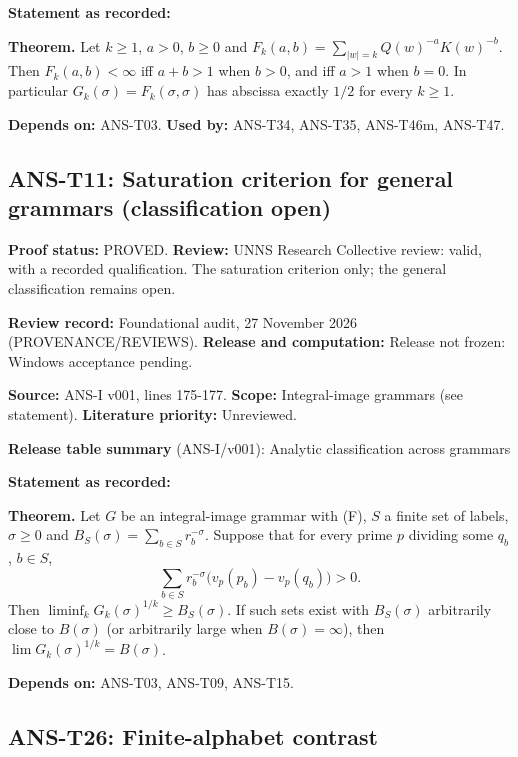\documentclass[
  11pt,
]{article}
\begin{document}
\textbf{Statement as recorded:}

\textbf{Theorem.} Let \(k\ge1\), \(a>0\), \(b\ge0\) and
\(F_k(a,b)=\sum_{|w|=k}Q(w)^{-a}K(w)^{-b}\). Then \(F_k(a,b)<\infty\)
iff \(a+b>1\) when \(b>0\), and iff \(a>1\) when \(b=0\). In particular
\(G_k(\sigma)=F_k(\sigma,\sigma)\) has abscissa exactly \(1/2\) for
every \(k\ge1\).

\textbf{Depends on:} ANS-T03. \textbf{Used by:} ANS-T34, ANS-T35,
ANS-T46m, ANS-T47.

\hypertarget{ans-t11-saturation-criterion-for-general-grammars-classification-open}{%
\subsection{ANS-T11: Saturation criterion for general grammars
(classification
open)}\label{ans-t11-saturation-criterion-for-general-grammars-classification-open}}

\textbf{Proof status:} PROVED. \textbf{Review:} UNNS Research Collective
review: valid, with a recorded qualification. The saturation criterion
only; the general classification remains open.

\textbf{Review record:} Foundational audit, 27 November 2026
(PROVENANCE/REVIEWS). \textbf{Release and computation:} Release not
frozen: Windows acceptance pending.

\textbf{Source:} ANS-I v001, lines 175-177. \textbf{Scope:}
Integral-image grammars (see statement). \textbf{Literature priority:}
Unreviewed.

\textbf{Release table summary} (ANS-I/v001): Analytic classification
across grammars

\textbf{Statement as recorded:}

\textbf{Theorem.} Let \(G\) be an integral-image grammar with (F), \(S\)
a finite set of labels, \(\sigma\ge0\) and
\(B_S(\sigma)=\sum_{b\in S}r_b^{-\sigma}\). Suppose that for every prime
\(p\) dividing some \(q_b\), \(b\in S\),
\[\sum_{b\in S}r_b^{-\sigma}\big(v_p(p_b)-v_p(q_b)\big)>0 .\] Then
\(\liminf_kG_k(\sigma)^{1/k}\ge B_S(\sigma)\). If such sets exist with
\(B_S(\sigma)\) arbitrarily close to \(B(\sigma)\) (or arbitrarily large
when \(B(\sigma)=\infty\)), then \(\lim G_k(\sigma)^{1/k}=B(\sigma)\).

\textbf{Depends on:} ANS-T03, ANS-T09, ANS-T15.

\hypertarget{ans-t26-finite-alphabet-contrast}{%
\subsection{ANS-T26: Finite-alphabet
contrast}\label{ans-t26-finite-alphabet-contrast}}
\end{document}
